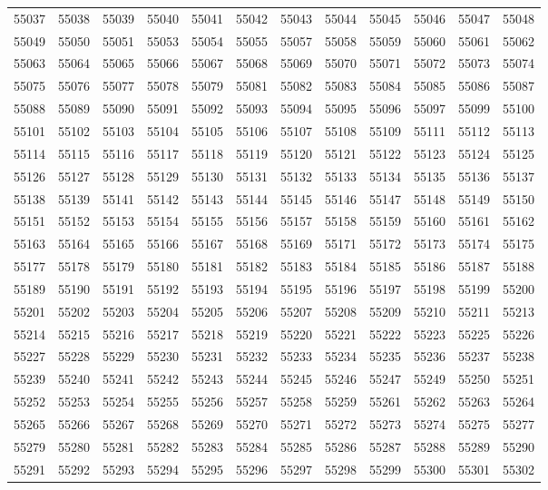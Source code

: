 \begin{center}
\begin{longtable}{llllllllllll}
55037 &55038 &55039 &55040 &55041 &55042 &55043 &55044 &55045 &55046 &55047 &55048 \\
55049 &55050 &55051 &55053 &55054 &55055 &55057 &55058 &55059 &55060 &55061 &55062 \\
55063 &55064 &55065 &55066 &55067 &55068 &55069 &55070 &55071 &55072 &55073 &55074 \\
55075 &55076 &55077 &55078 &55079 &55081 &55082 &55083 &55084 &55085 &55086 &55087 \\
55088 &55089 &55090 &55091 &55092 &55093 &55094 &55095 &55096 &55097 &55099 &55100 \\
55101 &55102 &55103 &55104 &55105 &55106 &55107 &55108 &55109 &55111 &55112 &55113 \\
55114 &55115 &55116 &55117 &55118 &55119 &55120 &55121 &55122 &55123 &55124 &55125 \\
55126 &55127 &55128 &55129 &55130 &55131 &55132 &55133 &55134 &55135 &55136 &55137 \\
55138 &55139 &55141 &55142 &55143 &55144 &55145 &55146 &55147 &55148 &55149 &55150 \\
55151 &55152 &55153 &55154 &55155 &55156 &55157 &55158 &55159 &55160 &55161 &55162 \\
55163 &55164 &55165 &55166 &55167 &55168 &55169 &55171 &55172 &55173 &55174 &55175 \\
55177 &55178 &55179 &55180 &55181 &55182 &55183 &55184 &55185 &55186 &55187 &55188 \\
55189 &55190 &55191 &55192 &55193 &55194 &55195 &55196 &55197 &55198 &55199 &55200 \\
55201 &55202 &55203 &55204 &55205 &55206 &55207 &55208 &55209 &55210 &55211 &55213 \\
55214 &55215 &55216 &55217 &55218 &55219 &55220 &55221 &55222 &55223 &55225 &55226 \\
55227 &55228 &55229 &55230 &55231 &55232 &55233 &55234 &55235 &55236 &55237 &55238 \\
55239 &55240 &55241 &55242 &55243 &55244 &55245 &55246 &55247 &55249 &55250 &55251 \\
55252 &55253 &55254 &55255 &55256 &55257 &55258 &55259 &55261 &55262 &55263 &55264 \\
55265 &55266 &55267 &55268 &55269 &55270 &55271 &55272 &55273 &55274 &55275 &55277 \\
55279 &55280 &55281 &55282 &55283 &55284 &55285 &55286 &55287 &55288 &55289 &55290 \\
55291 &55292 &55293 &55294 &55295 &55296 &55297 &55298 &55299 &55300 &55301 &55302 \\

\end{longtable}
\end{center}
